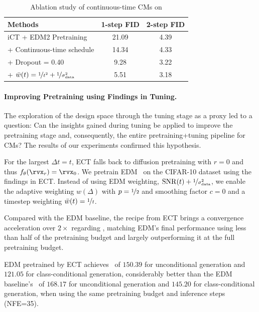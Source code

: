 \begin{table}[h]
\centering
\caption{Ablation study of continuous-time CMs on \imgnet}
\vspace{5pt}
\label{tab:tuning-ablation}
\begin{tabular}{lcc}
\toprule
Methods & 1-step FID & 2-step FID \\
\midrule
iCT + EDM2 Pretraining                             & 21.09 & 4.39 \\
+ Continuous-time schedule                         & 14.34 & 4.33 \\
+ Dropout = 0.40                                   & 9.28  & 3.22 \\
+ $\Bar{w}(t)=\nicefrac{1}{t^2}+\nicefrac{1}{\sigma_{\mathrm{data}}^2}$ & 5.51  & 3.18 \\
\bottomrule
\end{tabular}
\vspace{5pt}
\end{table}


\paragraph{Improving Pretraining using Findings in Tuning.} The exploration of the design space through the tuning stage as a proxy led to a question: Can the insights gained during tuning be applied to improve the pretraining stage and, consequently, the entire pretraining+tuning pipeline for CMs? The results of our experiments confirmed this hypothesis.

For the largest $\Delta t = t$, ECT falls back to diffusion pretraining with $r=0$ and thus $\f(\x_r) = \x_0$. 
%
We pretrain EDM~\citep{Karras2022edm} on the CIFAR-10 dataset using the findings in ECT. Instead of using EDM weighting, $\mathrm{SNR}(t) + \nicefrac{1}{\sigma_{\mathrm{data}}^2}$, we enable the adaptive weighting $w(\Delta)$ with $p=\nicefrac{1}{2}$ and smoothing factor $c=0$ and a timestep weighting $\Bar{w}(t) = \nicefrac{1}{t}$.

Compared with the EDM baseline, the recipe from ECT brings a convergence acceleration over $2\times$ regarding \dino, matching EDM's final performance using less than half of the pretraining budget and largely outperforming it at the full pretraining budget. 

EDM pretrained by ECT achieves \dino\ of $150.39$ for unconditional generation and $121.05$ for class-conditional generation, considerably better than the EDM baseline's \dino\ of $168.17$ for unconditional generation and $145.20$ for class-conditional generation, when using the same pretraining budget and inference steps (NFE=35).


